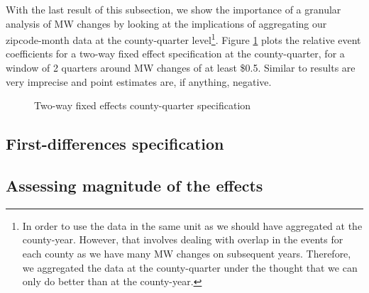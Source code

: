 With the last result of this subsection, we show the importance of a granular analysis of MW changes by looking at the implications of aggregating our zipcode-month data at the county-quarter level\footnote{In order to use the data in the same unit as \textcite{tidemann2018mw,yamagishi2019minimum} we should have aggregated at the county-year. However, that involves dealing with overlap in the events for each county as we have many MW changes on subsequent years. Therefore, we aggregated the data at the county-quarter under the thought that we can only do better than at the county-year.}. Figure \ref{fig:event_level_county2way} plots the relative event coefficients for a two-way fixed effect specification at the county-quarter, for a window of 2 quarters around MW changes of at least \$0.5. Similar to \textcite{tidemann2018mw} results are very imprecise and point estimates are, if anything, negative. 

\begin{figure}[h!]
    \centering
    \caption{Two-way fixed effects county-quarter specification}
    \label{fig:event_level_county2way}
\end{figure}

\subsection{First-differences specification}\label{subsec:results/first-differences}




\subsection{Assessing magnitude of the effects}\label{subsec:results/magnitude}


